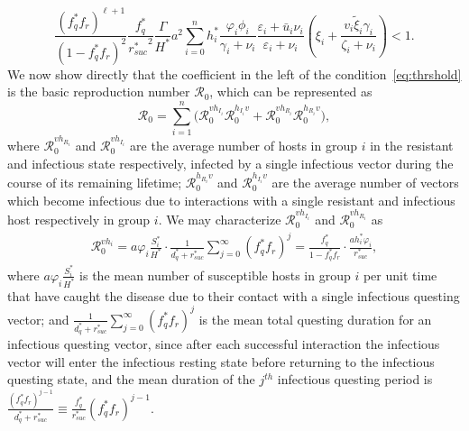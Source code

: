 \documentclass[a4paper]{article}
\newcommand{\dsum}{\displaystyle\sum}
\newcommand{\varpiVar}{r_{suc}}
\newcommand{\hatmuVar}{d_q}
\newcommand{\miVar}{\varphi_i}
\begin{document}
\begin{equation}\label{eq:thrshold}
\frac{({f_q^*}f_r)^{\ell+1}}{(1-f_q^*f_r)^2}\dfrac{f_q^*}{{\varpiVar ^*}^2}\dfrac{\Gamma}{H^*}a^2\sum_{i=0}^nh_i^*\frac{\varphi_i\phi_i}{\gamma_i+\nu_i}\frac{\varepsilon_i+\bar u_i\nu_i }{\varepsilon_i+\nu_i}\left(\xi_{i}+\frac{v_i\widetilde \xi_{i}\gamma_i}{\zeta_i+\nu_i}\right)<1.
\end{equation}
We now show directly that the coefficient in the left of the condition~\eqref{eq:thrshold} is the basic reproduction number $\mathcal R_0$, which can be represented as
\begin{equation}\label{eq:R0formula}
\mathcal R_0 = \sum_{i=1}^n \Big(\mathcal R_0^{vh_{I_i}} \mathcal R_0^{h_{I_i}v}+\mathcal R_0^{vh_{R_i}} \mathcal R_0^{h_{R_i}v}\Big),
\end{equation}
where $ \mathcal R_0^{vh_{R_i}}$ and $ \mathcal R_0^{vh_{I_i}}$ are the average number of hosts in group $i$ in the resistant and infectious state respectively, infected by a single infectious vector during the course of its remaining lifetime; $\mathcal R_0^{h_{R_i} v}$ and $\mathcal R_0^{h_{I_i} v}$  are the average number of vectors which become infectious due to interactions with a single resistant and infectious host respectively  in group $i$. We may characterize $\mathcal R_0^{vh_{I_i}}$ and  $\mathcal R_0^{vh_{R_i}}$ as
\begin{align*}
\mathcal R_0^{vh_i} =  a\miVar\frac{S_i^*}{H^*}\cdot\frac{1}{\hatmuVar ^*+ \varpiVar ^*}\sum_{j=0}^{\infty} (f_q^* f_r)^{j}  =   \frac{f_q^*} {1-f_q^* f_r} \cdot  \frac{a h_i^* \miVar}{\varpiVar ^*},  
\end{align*}
where $a\miVar\frac{S^*_i}{H^*}$ is the mean number of susceptible hosts in group $i$ per unit time that have caught the disease due to their contact with a single infectious questing vector; and  $\frac{1}{\hatmuVar ^*+ \varpiVar ^*}\dsum_{j=0}^{\infty} (f_q^* f_r)^{j}$ is the mean total questing duration for an infectious questing vector, since after each successful interaction  the infectious vector will enter the infectious resting state before returning to the infectious questing state, and the mean  duration of the $j^{th}$ infectious questing period is $\frac{(f_q^* f_r)^{j-1}}{\hatmuVar ^*+ \varpiVar ^*}\equiv\frac{f_q^*}{\varpiVar ^*}(f_q^* f_r)^{j-1}$.
\end{document}
